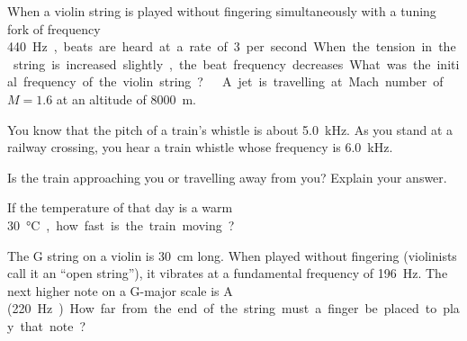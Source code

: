 \documentclass{../oss-apphys-exam}
\begin{document}
\begin{questions}

  \question When a violin string is played without fingering simultaneously
  with a tuning fork of frequency \SI{440}\hertz, beats are heard at a rate
  of 3 per second. When the tension in the string is increased slightly, the
  beat frequency decreases. What was the initial frequency of the violin string?
  \newpage
  
  \question A jet is travelling at Mach number of $M=1.6$ at an altitude of
  \SI{8000}\metre.
  
  \question You know that the pitch of a train's whistle is about
  \SI{5.0}{\kilo\hertz}. As you stand at a railway crossing, you hear a train
  whistle whose frequency is \SI{6.0}{\kilo\hertz}.
  \begin{parts}
  \item Is the train approaching you or travelling away from you? Explain your
    answer.
  \item If the temperature of that day is a warm \SI{30}\celsius, how fast is
    the train moving?
  \end{parts}
  \vspace{\stretch2}

  \question The G string on a violin is \SI{30}{\centi\metre} long. When played
  without fingering (violinists call it an ``open string''), it vibrates at a
  fundamental frequency of \SI{196}{\hertz}. The next higher note on a G-major
  scale is A (\SI{220}\hertz). %
  How far from the end of the string must a finger be placed to play that note?
  \vspace{\stretch2}
  \newpage
  

\end{questions}
\end{document}

